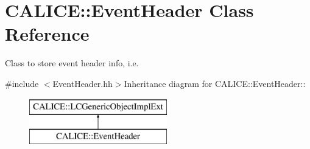 \section{CALICE::EventHeader Class Reference}
\label{classCALICE_1_1EventHeader}


Class to store event header info, i.e.  


{\ttfamily \#include $<$EventHeader.hh$>$}Inheritance diagram for CALICE::EventHeader::\begin{figure}[H]
\begin{center}
\leavevmode
\includegraphics[height=2cm]{classCALICE_1_1EventHeader}
\end{center}
\end{figure}
